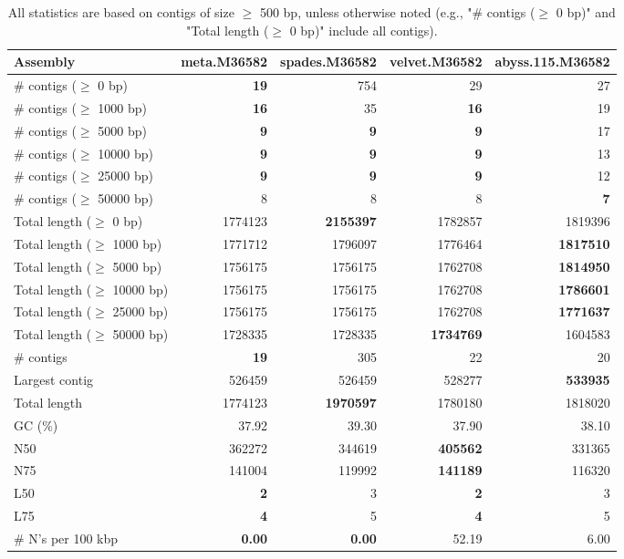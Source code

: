 \documentclass[12pt,a4paper]{article}
\begin{document}
\begin{table}[ht]
\begin{center}
\caption{All statistics are based on contigs of size $\geq$ 500 bp, unless otherwise noted (e.g., "\# contigs ($\geq$ 0 bp)" and "Total length ($\geq$ 0 bp)" include all contigs).}
\begin{tabular}{|l*{4}{|r}|}
\hline
Assembly & meta.M36582 & spades.M36582 & velvet.M36582 & abyss.115.M36582 \\ \hline
\# contigs ($\geq$ 0 bp) & {\bf 19} & 754 & 29 & 27 \\ \hline
\# contigs ($\geq$ 1000 bp) & {\bf 16} & 35 & {\bf 16} & 19 \\ \hline
\# contigs ($\geq$ 5000 bp) & {\bf 9} & {\bf 9} & {\bf 9} & 17 \\ \hline
\# contigs ($\geq$ 10000 bp) & {\bf 9} & {\bf 9} & {\bf 9} & 13 \\ \hline
\# contigs ($\geq$ 25000 bp) & {\bf 9} & {\bf 9} & {\bf 9} & 12 \\ \hline
\# contigs ($\geq$ 50000 bp) & 8 & 8 & 8 & {\bf 7} \\ \hline
Total length ($\geq$ 0 bp) & 1774123 & {\bf 2155397} & 1782857 & 1819396 \\ \hline
Total length ($\geq$ 1000 bp) & 1771712 & 1796097 & 1776464 & {\bf 1817510} \\ \hline
Total length ($\geq$ 5000 bp) & 1756175 & 1756175 & 1762708 & {\bf 1814950} \\ \hline
Total length ($\geq$ 10000 bp) & 1756175 & 1756175 & 1762708 & {\bf 1786601} \\ \hline
Total length ($\geq$ 25000 bp) & 1756175 & 1756175 & 1762708 & {\bf 1771637} \\ \hline
Total length ($\geq$ 50000 bp) & 1728335 & 1728335 & {\bf 1734769} & 1604583 \\ \hline
\# contigs & {\bf 19} & 305 & 22 & 20 \\ \hline
Largest contig & 526459 & 526459 & 528277 & {\bf 533935} \\ \hline
Total length & 1774123 & {\bf 1970597} & 1780180 & 1818020 \\ \hline
GC (\%) & 37.92 & 39.30 & 37.90 & 38.10 \\ \hline
N50 & 362272 & 344619 & {\bf 405562} & 331365 \\ \hline
N75 & 141004 & 119992 & {\bf 141189} & 116320 \\ \hline
L50 & {\bf 2} & 3 & {\bf 2} & 3 \\ \hline
L75 & {\bf 4} & 5 & {\bf 4} & 5 \\ \hline
\# N's per 100 kbp & {\bf 0.00} & {\bf 0.00} & 52.19 & 6.00 \\ \hline
\end{tabular}
\end{center}
\end{table}
\end{document}
